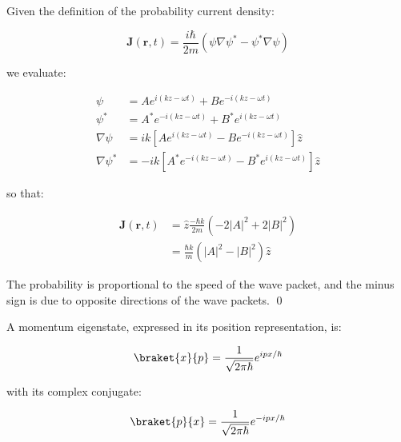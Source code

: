 \documentclass[12pt]{article}
\begin{document}
Given the definition of the probability current density:

\begin{equation}
    \mathbf{J}(\mathbf{r}, t) = \frac{i\hbar}{2m} \left( \psi \nabla \psi^{*} - \psi^{*} \nabla \psi \right)
\end{equation}

we evaluate:

\begin{equation}
    \begin{split}
        \psi &= A e^{i(kz - \omega t)} + B e^{-i(kz - \omega t)} \\
        \psi^{*} &= A^{*} e^{-i(kz - \omega t)} + B^{*} e^{i(kz - \omega t)} \\
        \nabla \psi &= ik \left[ A e^{i(kz - \omega t)} - B e^{-i(kz - \omega t)} \right] \hat{z} \\
        \nabla \psi^{*} &= -ik \left[ A^{*} e^{-i(kz - \omega t)} - B^{*} e^{i(kz - \omega t)} \right] \hat{z}
    \end{split}
\end{equation}

so that:

\begin{equation}
    \begin{split}
        \mathbf{J}(\mathbf{r}, t) &= \hat{z} \frac{-\hbar k}{2m} \left( -2\left\lvert A \right\rvert^{2} + 2\left\lvert B \right\rvert^{2} \right) \\
        &= \frac{\hbar k}{m} \left( \left\lvert A \right\rvert^{2} - \left\lvert B \right\rvert^{2} \right) \hat{z}
    \end{split}
\end{equation}

The probability is proportional to the speed of the wave packet, and the minus sign is due to opposite directions of the wave packets.
\qed


A momentum eigenstate, expressed in its position representation, is:

\begin{equation}
    \braket{x}{p} = \frac{1}{\sqrt{2\pi\hbar}} e^{ipx/\hbar}
\end{equation}

with its complex conjugate:

\begin{equation}
    \braket{p}{x} = \frac{1}{\sqrt{2\pi\hbar}} e^{-ipx/\hbar}
\end{equation}
\end{document}
